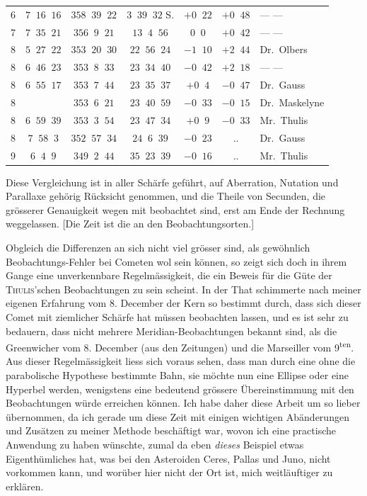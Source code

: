 \begin{center}
\begin{tabular}{|c|c|c|c|c|c|l|}
6 & $7\;\;16\;\;16$ & $358\;\;39\;\;22$ & $3\;\;39\;\;32$ S. & $+0\;\;22$ & $+0\;\;48$ & --- --- \\
7 & $7\;\;35\;\;21$ & $356\;\;9\;\;21$ & $13\;\;4\;\;56$ & $0\;\;0$ & $+0\;\;42$ & --- --- \\
8 & $5\;\;27\;\;22$ & $353\;\;20\;\;30$ & $22\;\;56\;\;24$ & $-1\;\;10$ & $+2\;\;44$ & Dr.\ Olbers \\
8 & $6\;\;46\;\;23$ & $353\;\;8\;\;33$ & $23\;\;34\;\;40$ & $-0\;\;42$ & $+2\;\;18$ & --- --- \\
8 & $6\;\;55\;\;17$ & $353\;\;7\;\;44$ & $23\;\;35\;\;37$ & $+0\;\;4$ & $-0\;\;47$ & Dr.\ Gauss \\
8 & & $353\;\;6\;\;21$ & $23\;\;40\;\;59$ & $-0\;\;33$ & $-0\;\;15$ & Dr.\ Maskelyne \\
8 & $6\;\;59\;\;39$ & $353\;\;3\;\;54$ & $23\;\;47\;\;34$ & $+0\;\;9$ & $-0\;\;33$ & Mr.\ Thulis \\
8 & $7\;\;58\;\;3$ & $352\;\;57\;\;34$ & $24\;\;6\;\;39$ & $-0\;\;23$ & .\quad . & Dr.\ Gauss \\
9 & $6\;\;4\;\;9$ & $349\;\;2\;\;44$ & $35\;\;23\;\;39$ & $-0\;\;16$ & .\quad . & Mr.\ Thulis \\
\hline
\end{tabular}\endgroup\end{center}



\par\indent Diese Vergleichung ist in aller Schärfe geführt, auf Aberration, Nutation und Parallaxe gehörig
%
Rücksicht genommen, und die Theile von Secunden, die grösserer Genauigkeit wegen mit beobachtet
sind, erst am Ende der Rechnung weggelassen. [Die Zeit ist die an den Beobachtungsorten.]

\par\indent Obgleich die Differenzen an sich nicht viel grösser sind, als gewöhnlich Beobachtungs-Fehler bei
Cometen wol sein können, so zeigt sich doch in ihrem Gange eine unverkennbare Regelmässigkeit, die
ein Beweis für die Güte der \textsc{Thulis}'schen Beobachtungen zu sein scheint. In der That
schimmerte nach meiner eigenen Erfahrung vom 8. December der Kern so bestimmt durch, dass sich
dieser Comet mit ziemlicher Schärfe hat müssen beobachten lassen, und es ist sehr zu bedauern, dass
nicht mehrere Meridian-Beobachtungen bekannt sind, als die Greenwicher vom 8. December (aus den
Zeitungen) und die Marseiller vom 9\textsuperscript{ten}. Aus dieser Regelmässigkeit liess sich
voraus sehen, dass man durch eine ohne die parabolische Hypothese bestimmte Bahn, sie möchte nun
eine Ellipse oder eine Hyperbel werden, wenigstens eine bedeutend grössere Übereinstimmung mit den
Beobachtungen würde erreichen können. Ich habe daher diese Arbeit um so lieber übernommen, da ich
gerade um diese Zeit mit einigen wichtigen Abänderungen und Zusätzen zu meiner Methode beschäftigt
war, wovon ich eine practische Anwendung zu haben wünschte, zumal da eben \emph{dieses} Beispiel
etwas Eigenthümliches hat, was bei den Asteroiden Ceres, Pallas und Juno, nicht vorkommen kann, und
worüber hier nicht der Ort ist, mich weitläuftiger zu erklären.

